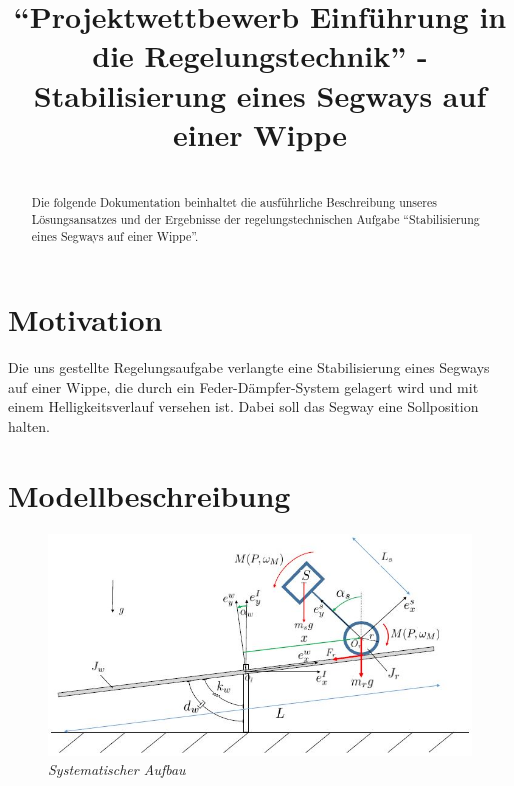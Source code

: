 \documentclass[pdf]{ifacconf}
\begin{document}
\begin{frontmatter}

\title{``Projektwettbewerb Einführung in die Regelungstechnik'' - Stabilisierung eines Segways auf einer Wippe}


\textbf{}

\begin{abstract}\\                          %
Die folgende Dokumentation beinhaltet die ausführliche Beschreibung unseres Lösungsansatzes und der Ergebnisse der regelungstechnischen Aufgabe ``Stabilisierung eines Segways auf einer Wippe''. 
\end{abstract}

\end{frontmatter}

\section{Motivation}
Die uns gestellte Regelungsaufgabe verlangte eine Stabilisierung eines Segways auf einer Wippe, die durch ein Feder-Dämpfer-System gelagert wird und mit einem Helligkeitsverlauf versehen ist. Dabei soll das Segway eine Sollposition halten. 

\section{Modellbeschreibung}
\begin{figure}[h]	
\centerline{\includegraphics[width=\linewidth]{Bilder/SystematischerAufbau.jpg}}
	\caption{\textit{Systematischer Aufbau}}
\end{figure}
\end{document}
